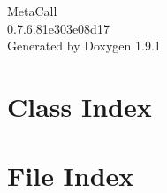 \let\mypdfximage\pdfximage\def\pdfximage{\immediate\mypdfximage}\documentclass[twoside]{book}
\newcommand{\+}{\discretionary{\mbox{\scriptsize$\hookleftarrow$}}{}{}}
\newcommand{\clearemptydoublepage}{%
  \newpage{\pagestyle{empty}\cleardoublepage}%
}
\begin{document}
\raggedbottom

\begin{titlepage}
\vspace*{7cm}
\begin{center}%
{\Large Meta\+Call \\[1ex]\large 0.\+7.\+6.\+81e303e08d17 }\\
\vspace*{1cm}
{\large Generated by Doxygen 1.9.1}\\
\end{center}
\end{titlepage}
\clearemptydoublepage
{}
\tableofcontents
\clearemptydoublepage
{}

\chapter{Class Index}

\chapter{File Index}

\end{document}
